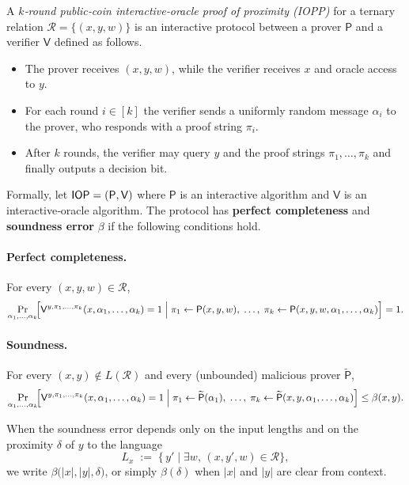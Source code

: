 

\begin{definition}\label{def:iopp}
    A \emph{$k$‑round public‑coin interactive‑oracle proof of proximity
    (IOPP)} for a ternary relation $\mathcal R = \{(x,y,w)\}$ is an
    interactive protocol between a prover $\mathsf P$ and a verifier
    $\mathsf V$ defined as follows.
    
    \begin{itemize}
      \item The prover receives $(x,y,w)$, while the verifier receives $x$
            and oracle access to $y$.
    
      \item For each round $i\in[k]$ the verifier sends a uniformly random
            message $\alpha_i$ to the prover, who responds with a proof
            string $\pi_i$.
    
      \item After $k$ rounds, the verifier may query $y$ and the proof
            strings $\pi_1,\dots,\pi_k$ and finally outputs a decision bit.
    \end{itemize}
    
    Formally, let $\mathsf{IOP}=(\mathsf P,\mathsf V)$ where $\mathsf P$ is an
    interactive algorithm and $\mathsf V$ is an interactive‑oracle algorithm.
    The protocol has \textbf{perfect completeness} and \textbf{soundness
    error} $\beta$ if the following conditions hold.
    
    \paragraph{Perfect completeness.}
    For every $(x,y,w)\in\mathcal R$,
    \[
      \Pr_{\alpha_1,\ldots,\alpha_k}\!\Bigl[
        \mathsf V^{y,\pi_1,\ldots,\pi_k}(x,\alpha_1,\ldots,\alpha_k)=1
        \;\Big|\;
        \pi_1\leftarrow\mathsf P(x,y,w),\;
        \dots,\;
        \pi_k\leftarrow\mathsf P(x,y,w,\alpha_1,\ldots,\alpha_k)
      \Bigr]=1.
    \]
    
    \paragraph{Soundness.}
    For every $(x,y)\notin L(\mathcal R)$ and every (unbounded) malicious
    prover $\widetilde{\mathsf P}$,
    \[
      \Pr_{\alpha_1,\ldots,\alpha_k}\!\Bigl[
        \mathsf V^{y,\pi_1,\ldots,\pi_k}(x,\alpha_1,\ldots,\alpha_k)=1
        \;\Big|\;
        \pi_1\leftarrow\widetilde{\mathsf P}(\alpha_1),\;
        \dots,\;
        \pi_k\leftarrow\widetilde{\mathsf P}
              (x,y,\alpha_1,\ldots,\alpha_k)
      \Bigr]\le \beta(x,y).
    \]
    
    When the soundness error depends only on the input lengths and on the
    proximity $\delta$ of $y$ to the language
    \[
      L_x \;:=\; \{\,y' \mid \exists w,\,(x,y',w)\in\mathcal R\},
    \]
    we write $\beta\bigl(|x|,|y|,\delta\bigr)$, or simply
    $\beta(\delta)$ when $|x|$ and $|y|$ are clear from context.
    \end{definition}
    